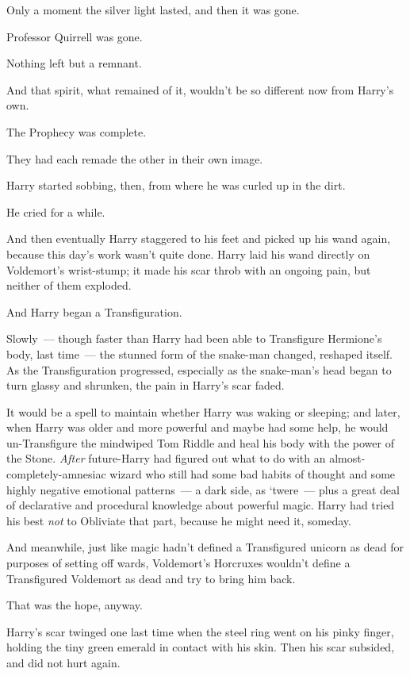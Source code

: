 Only a moment the silver light lasted, and then it was gone.

Professor Quirrell was gone.

Nothing left but a remnant.

And that spirit, what remained of it, wouldn't be so different now from Harry's
own.

The Prophecy was complete.

They had each remade the other in their own image.

Harry started sobbing, then, from where he was curled up in the dirt.

He cried for a while.

And then eventually Harry staggered to his feet and picked up his wand again,
because this day's work wasn't quite done.
\sbreak
Harry laid his wand directly on Voldemort's wrist-stump; it made his scar throb
with an ongoing pain, but neither of them exploded.

And Harry began a Transfiguration.

Slowly~--- though faster than Harry had been able to Transfigure Hermione's body,
last time~--- the stunned form of the snake-man changed, reshaped itself. As the
Transfiguration progressed, especially as the snake-man's head began to turn
glassy and shrunken, the pain in Harry's scar faded.

It would be a spell to maintain whether Harry was waking or sleeping; and
later, when Harry was older and more powerful and maybe had some help, he would
un-Transfigure the mindwiped Tom Riddle and heal his body with the power of the
Stone. \emph{After} future-Harry had figured out what to do with an
almost-completely-amnesiac wizard who still had some bad habits of thought and
some highly negative emotional patterns~--- a dark side, as `twere~--- plus a great
deal of declarative and procedural knowledge about powerful magic. Harry had
tried his best \emph{not} to Obliviate that part, because he might need it,
someday.

And meanwhile, just like magic hadn't defined a Transfigured unicorn as dead
for purposes of setting off wards, Voldemort's Horcruxes wouldn't define a
Transfigured Voldemort as dead and try to bring him back.

That was the hope, anyway.

Harry's scar twinged one last time when the steel ring went on his pinky
finger, holding the tiny green emerald in contact with his skin. Then his scar
subsided, and did not hurt again.

